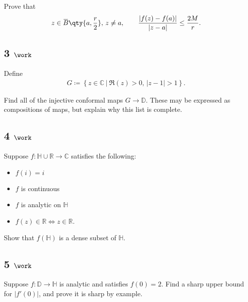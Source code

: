 Prove that
\begin{align*}  
z\in \mkern 1.5mu\overline{\mkern-1.5muB\mkern-1.5mu}\mkern 1.5mu\qty{a, {r\over 2}},\,z\neq a, \qquad {{\left\lvert { f(z) - f(a)} \right\rvert} \over {\left\lvert {z-a} \right\rvert}} \leq {2M \over r}
.\end{align*}

\hypertarget{work-69}{%
\subsection{\texorpdfstring{3
\(\work\)}{3 \textbackslash work}}\label{work-69}}

Define
\begin{align*}  
G \coloneqq\left\{{z\in {\mathbb{C}}{~\mathrel{\Big|}~}\Re(z) > 0, \, {\left\lvert {z-1} \right\rvert} > 1}\right\}
.\end{align*}

Find all of the injective conformal maps \(G\to {\mathbb{D}}\). These
may be expressed as compositions of maps, but explain why this list is
complete.

\hypertarget{work-70}{%
\subsection{\texorpdfstring{4
\(\work\)}{4 \textbackslash work}}\label{work-70}}

Suppose \(f: {\mathbb{H}}\cup{\mathbb{R}}\to {\mathbb{C}}\) satisfies
the following:

\begin{itemize}
\tightlist
\item
  \(f(i) = i\)
\item
  \(f\) is continuous
\item
  \(f\) is analytic on \({\mathbb{H}}\)
\item
  \(f(z) \in {\mathbb{R}}\iff z\in {\mathbb{R}}\).
\end{itemize}

Show that \(f({\mathbb{H}})\) is a dense subset of \({\mathbb{H}}\).

\hypertarget{work-71}{%
\subsection{\texorpdfstring{5
\(\work\)}{5 \textbackslash work}}\label{work-71}}

Suppose \(f: {\mathbb{D}}\to {\mathbb{H}}\) is analytic and satisfies
\(f(0) = 2\). Find a sharp upper bound for
\({\left\lvert {f'(0)} \right\rvert}\), and prove it is sharp by
example.

